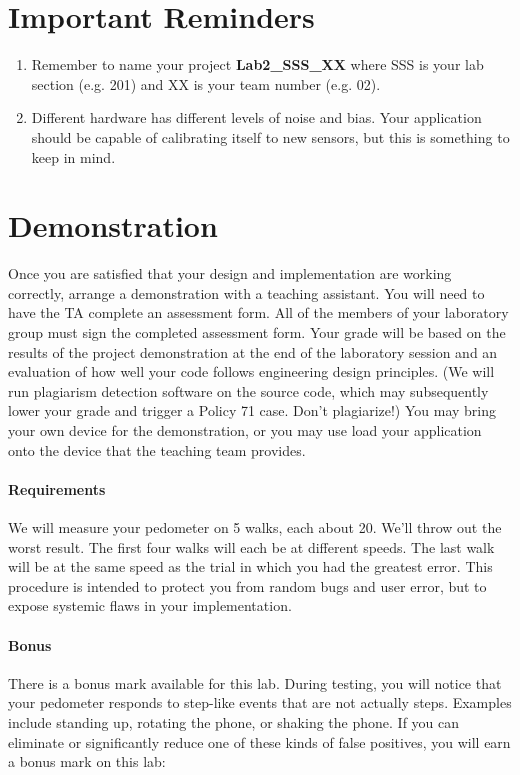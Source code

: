 \documentclass[10pt]{article}
\begin{document}
\section{Important Reminders}
\begin{enumerate}
\item Remember to name your project \textbf{Lab2\_SSS\_XX} where SSS is your lab section (e.g. 201) and XX is your team number (e.g. 02). 
\item Different hardware has different levels of noise and bias. Your application should be capable of calibrating itself to new sensors, but this is something to keep in mind.
\end{enumerate}

\section{Demonstration}
Once you are satisfied that your design and implementation are working correctly, arrange a demonstration with a teaching assistant.  You will need to have the TA complete an assessment form.  All of the members of your laboratory group must sign the completed assessment form.  Your grade will be based on the results of the project demonstration at the end of the laboratory session and an evaluation of how well your code follows engineering design principles. (We will run plagiarism detection software on the source code, which may subsequently lower your grade and trigger a Policy 71 case. Don't plagiarize!) You may bring your own device for the demonstration, or you may use load your application onto the device that the teaching team provides.

\paragraph{Requirements}

We will measure your pedometer on 5 walks, each about 20. We'll throw out the worst result. The first four walks will each be at different speeds. The last walk will be at the same speed as the trial in which you had the greatest error. This procedure is intended to protect you from random bugs and user error, but to expose systemic flaws in your implementation.

\paragraph{Bonus}
There is a bonus mark available for this lab. During testing, you will notice that your pedometer responds to step-like events that are not actually steps. Examples include standing up, rotating the phone, or shaking the phone. If you can eliminate or significantly reduce one of these kinds of false positives, you will earn a bonus mark on this lab:
\end{document}
